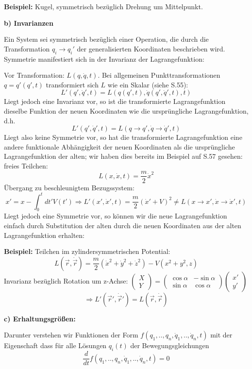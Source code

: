 \documentclass[10pt, letterpaper]{article}
\begin{document}
\textbf{Beispiel:} Kugel, symmetrisch bezüglich Drehung um Mittelpunkt.


\textbf{b) Invarianzen}

Ein System sei symmetrisch bezüglich einer Operation, die durch die Transformation $q_i \rightarrow q_i'$ der generalisierten Koordinaten beschrieben wird. Symmetrie manifestiert sich in der Invarianz der Lagrangefunktion:

Vor Transformation: $L(q,\dot{q},t)$. Bei allgemeinen Punkttransformationen $q = q'(q',t)$ transformiert sich $L$ wie ein Skalar (siehe S.55):
$$L'(q',\dot{q}',t) = L(q(q',t),\dot{q}(q',\dot{q}',t),t)$$
Liegt jedoch eine Invarianz vor, so ist die transformierte Lagrangefunktion dieselbe Funktion der neuen Koordinaten wie die ursprüngliche Lagrangefunktion, d.h.
$$L'(q',\dot{q}',t) = L(q\to q',\dot{q}\to\dot{q}',t)$$
Liegt also keine Symmetrie vor, so hat die transformierte Lagrangefunktion eine andere funktionale Abhängigkeit der neuen Koordinaten als die ursprüngliche Lagrangefunktion der alten; wir haben dies bereits im Beispiel auf S.57 gesehen: freies Teilchen: 
$$L(x,\dot{x},t) = \frac{m}{2}\dot{x}^2$$
Übergang zu beschleunigtem Bezugssystem: 
$$x' = x-\int_0^t dt' V(t') \Rightarrow L'(x',\dot{x}',t) = \frac{m}{2}(\dot{x}'+V)^2 \neq L(x\to x',\dot{x}\to\dot{x}',t)$$
Liegt jedoch eine Symmetrie vor, so können wir die neue Lagrangefunktion einfach durch Substitution der alten durch die neuen Koordinaten aus der alten Lagrangefunktion erhalten:




\textbf{Beispiel:} Teilchen im zylindersymmetrischen Potential:
$$L(\vec{r},\dot{\vec{r}}) = \frac{m}{2}(\dot{x}^2+\dot{y}^2+\dot{z}^2) - V(x^2+y^2,z)$$
Invarianz bezüglich Rotation um z-Achse: $\begin{pmatrix} X \\ Y \end{pmatrix} = \begin{pmatrix} \cos\alpha & -\sin\alpha \\ \sin\alpha & \cos\alpha \end{pmatrix} \begin{pmatrix} x' \\ y' \end{pmatrix}$
$$\Rightarrow L'(\vec{r}',\dot{\vec{r}}') = L(\vec{r},\dot{\vec{r}})$$




\textbf{c) Erhaltungsgrößen:}


Darunter verstehen wir Funktionen der Form $f(q_1,..,q_n,\dot{q}_1,..,\dot{q}_n,t)$ mit der Eigenschaft dass für alle Lösungen $q_i(t)$ der Bewegungsgleichungen
$$\frac{d}{dt}f(q_1,..,q_n,\dot{q}_1,..,\dot{q}_n,t) = 0$$
\end{document}
